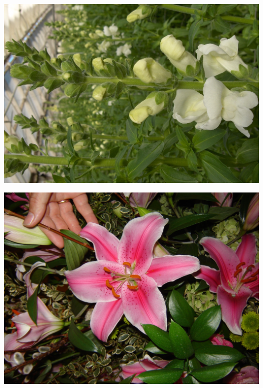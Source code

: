 \documentclass{article}
\begin{document}
\begin{center}
\includegraphics[height=0.925\paperheight]{../Snapdragon.jpg}
\end{center}
\newpage

\begin{center}
\includegraphics[height=0.925\paperheight]{../Stargazer_(OrientalLily).jpg}
\end{center}
\newpage
\end{document}
